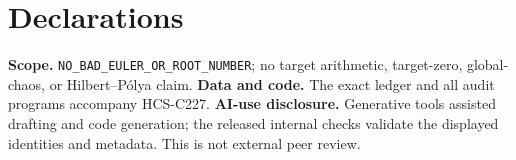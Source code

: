 \documentclass[11pt]{article}
\begin{document}
\section*{Declarations}
\textbf{Scope.} \nolinkurl{NO_BAD_EULER_OR_ROOT_NUMBER}; no target arithmetic,
target-zero, global-chaos, or Hilbert--Pólya claim.  \textbf{Data and code.}
The exact ledger and all audit programs accompany HCS-C227.  \textbf{AI-use
disclosure.} Generative tools assisted drafting and code generation; the
released internal checks validate the displayed identities and metadata.
This is not external peer review.
\end{document}
